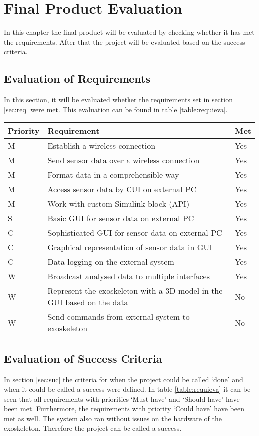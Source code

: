 \chapter{Final Product Evaluation}
\label{ch:eval}
In this chapter the final product will be evaluated by checking whether it has met the requirements. After that the project will be evaluated based on the success criteria.
\section{Evaluation of Requirements}
In this section, it will be evaluated whether the requirements set in section \ref{sec:req} were met. This evaluation can be found in table \ref{table:requieva}.\\

{\renewcommand{\arraystretch}{1.5}
	\centering
	\begin{tabular}{ | l | l || l || }
		\hline
		\bfseries{Priority} & \bfseries{Requirement} & \bfseries{Met} \\ \hline
		M & Establish a wireless connection & Yes \\ \hline
		M & Send sensor data over a wireless connection & Yes \\ \hline
		M & Format data in a comprehensible way & Yes \\ \hline
		M & Access sensor data by CUI on external PC & Yes \\ \hline
		M & Work with custom Simulink block (API) & Yes \\ \hline
		S & Basic GUI for sensor data on external PC & Yes \\ \hline
		C & Sophisticated GUI for sensor data on external PC & Yes \\ \hline
		C & Graphical representation of sensor data in GUI & Yes \\ \hline
		C & Data logging on the external system & Yes \\ \hline
		W & Broadcast analysed data to multiple interfaces & Yes \\ \hline
		W & Represent the exoskeleton with a 3D-model in the GUI based on the data & No \\ \hline
		W & Send commands from external system to exoskeleton & No \\ \hline 
	\end{tabular}
	\label{table:requieva}
}
\pagebreak

\section{Evaluation of Success Criteria} \label{sec:evasuc}
In section \ref{sec:suc} the criteria for when the project could be called `done' and when it could be called a success were defined. In table \ref{table:requieva} it can be seen that all requirements with priorities `Must have' and `Should have' have been met. Furthermore, the requirements with priority `Could have' have been met as well. The system also ran without issues on the hardware of the exoskeleton. Therefore the project can be called a success.
